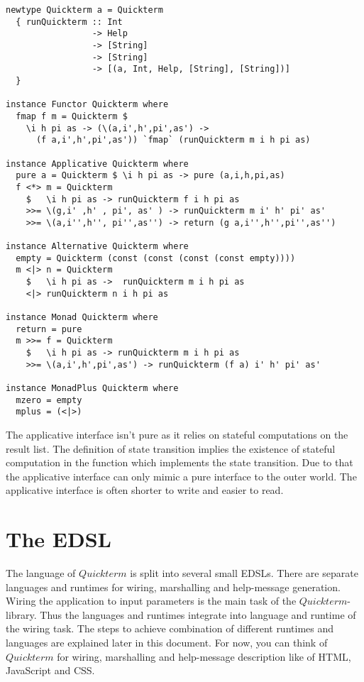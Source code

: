 \documentclass[a4paper]{article}
\begin{document}
\begin{lstlisting}
newtype Quickterm a = Quickterm
  { runQuickterm :: Int
                 -> Help
                 -> [String]
                 -> [String]
                 -> [(a, Int, Help, [String], [String])]
  }

instance Functor Quickterm where
  fmap f m = Quickterm $
    \i h pi as -> (\(a,i',h',pi',as') ->
      (f a,i',h',pi',as')) `fmap` (runQuickterm m i h pi as)

instance Applicative Quickterm where
  pure a = Quickterm $ \i h pi as -> pure (a,i,h,pi,as)
  f <*> m = Quickterm
    $   \i h pi as -> runQuickterm f i h pi as
    >>= \(g,i' ,h' , pi', as' ) -> runQuickterm m i' h' pi' as'
    >>= \(a,i'',h'', pi'',as'') -> return (g a,i'',h'',pi'',as'')

instance Alternative Quickterm where
  empty = Quickterm (const (const (const (const empty))))
  m <|> n = Quickterm
    $   \i h pi as ->  runQuickterm m i h pi as
    <|> runQuickterm n i h pi as

instance Monad Quickterm where
  return = pure
  m >>= f = Quickterm
    $   \i h pi as -> runQuickterm m i h pi as
    >>= \(a,i',h',pi',as') -> runQuickterm (f a) i' h' pi' as'

instance MonadPlus Quickterm where
  mzero = empty
  mplus = (<|>)
\end{lstlisting}

The applicative interface isn't pure as it relies on stateful computations on the result list. The definition of state transition implies the existence of stateful computation in the function which implements the state transition. Due to that the applicative interface can only mimic a pure interface to the outer world. The applicative interface is often shorter to write and easier to read.

\section{The EDSL}
The language of $Quickterm$ is split into several small EDSLs. There are separate languages and runtimes for wiring, marshalling and help-message generation. Wiring the application to input parameters is the main task of the $Quickterm$-library. Thus the languages and runtimes integrate into language and runtime of the wiring task. The steps to achieve combination of different runtimes and languages are explained later in this document. For now, you can think of $Quickterm$ for wiring, marshalling and help-message description like of HTML, JavaScript and CSS.
\end{document}
